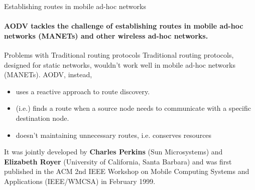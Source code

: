 \documentclass[11pt]{beamer}              %
\begin{document}


\begin{frame}{Establishing routes in mobile ad-hoc networks}
\framesubtitle{\alert{AODV} tackles the challenge of establishing routes in mobile ad-hoc networks (MANETs) and other wireless ad-hoc networks.}

\begin{block}{Problems with Traditional routing protocols} 
    Traditional routing protocols, designed for static networks, wouldn't work well in mobile ad-hoc networks (MANETs).
    \alert{AODV}, instead,
    \begin{itemize}
        \item uses a reactive approach to route discovery. 
        \item (i.e.) finds a route when a source node needs to communicate with a specific destination node.
        \item doesn't maintaining unnecessary routes, i.e. conserves resources
    \end{itemize}
\end{block}

It was jointly developed by \textbf{Charles Perkins} (Sun Microsystems) and \textbf{Elizabeth Royer} (University of California, Santa Barbara) and was first published in the ACM 2nd IEEE Workshop on Mobile Computing Systems and Applications (IEEE/WMCSA) in February 1999.
\note{}
\end{frame}
\end{document}
